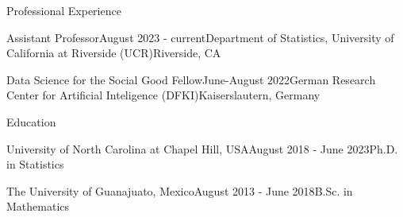 \documentclass{resume_customized} %
\begin{document}
\begin{rSection}{Professional Experience}
	
	\begin{rSubsection}{Assistant Professor}{August 2023 - current}{Department of Statistics, University of California at Riverside (UCR)}{Riverside, CA}
	
	\end{rSubsection}
	
	\begin{rSubsection}{Data Science for the Social Good Fellow}{June-August 2022}{German Research Center for Artificial Inteligence (DFKI)}{Kaiserslautern, Germany}
		
	\end{rSubsection}
	
	
\end{rSection}



\begin{rSection}{Education}
	
	\begin{rSubsection}{University of North Carolina at Chapel Hill, USA}{August 2018 - June 2023}{Ph.D. in Statistics}
			
	\end{rSubsection}

	\begin{rSubsection}{The University of Guanajuato, Mexico}{August 2013 - June 2018}{B.Sc. in Mathematics}
		
		
	\end{rSubsection}
\end{rSection}



\end{document}
